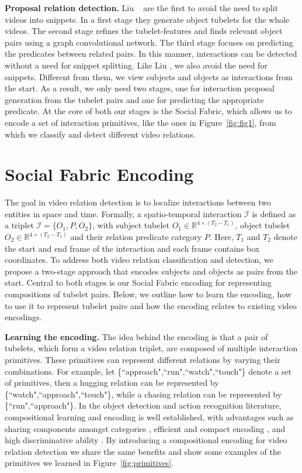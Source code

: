 \documentclass[10pt,twocolumn,letterpaper]{article}
\begin{document}
\textbf{Proposal relation detection.}
Liu \etal~\cite{liu2020beyond} are the first to avoid the need to split videos into snippets. In a first stage they generate object tubelets for the whole videos. The second stage refines the tubelet-features and finds relevant object pairs using a graph convolutional network. The third stage focuses on predicting the predicates between related pairs. In this manner, interactions can be detected without a need for snippet splitting. Like Liu \etal, we also avoid the need for snippets.
Different from them, we view subjects and objects as interactions from the start. As a result, we only need two stages, one for interaction proposal generation from the tubelet pairs and one for predicting the appropriate predicate. At the core of both our stages is the Social Fabric, which allows us to encode a set of interaction primitives, like the ones in Figure~\ref{fig:fig1}, from which we classify and detect different video relations. 

\section{Social Fabric Encoding}
The goal in video relation detection is to localize interactions between two entities in space and time. Formally, a spatio-temporal interaction $\mathcal{I}$ is defined as a triplet $\mathcal{I} = \{O_1,P,O_2\}$, with subject tubelet $O_1 \in \mathbb{R}^{4 \times (T_2 - T_1)}$, object tubelet $O_2 \in \mathbb{R}^{4 \times (T_2 - T_1)}$ and their relation predicate category $P$. Here, $T_1$ and $T_2$ denote the start and end frame of the interaction and each frame contains box coordinates. To address both video relation classification and detection, we propose a two-stage approach that encodes subjects and objects as pairs from the start. Central to both stages is our Social Fabric encoding for representing compositions of tubelet pairs. Below, we outline how to learn the encoding, how to use it to represent tubelet pairs and how the encoding relates to existing video encodings.

\textbf{Learning the encoding.}
The idea behind the encoding is that a pair of tubelets, which form a video relation triplet, are composed of multiple interaction primitives. These primitives can represent different relations by varying their combinations. For example, let \{``approach",``run",``watch",``touch"\} denote a set of primitives, then a hugging relation can be represented by \{``watch",``approach",``touch"\}, while a chasing relation can be represented by \{``run",``approach"\}. In the object detection and action recognition literature, compositional learning and encoding is well established, with advantages such as sharing components amongst categories \eg \cite{gaidon2013temporal}, efficient and compact encoding \eg \cite{yuille2011towards}, and high discriminative ability \eg \cite{juneja2013blocks, kortylewski2020compositional}. By introducing a compositional encoding for video relation detection we share the same benefits and show some examples of the primitives we learned in Figure~\ref{fig:primitives}.
\end{document}
